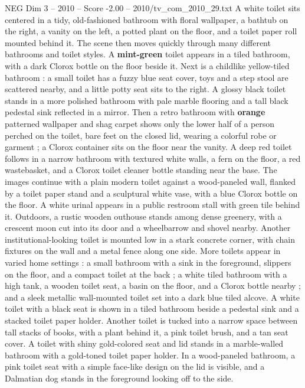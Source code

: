 \begin{textsample}{NEG Dim 3 – 2010 – Score -2.00 – 2010/tv\_com\_2010\_29.txt}  \label{ex:f3_neg_020}
A white toilet sits centered in a tidy, old-fashioned bathroom with floral wallpaper, a bathtub on the right, a vanity on the left, a potted plant on the floor, and a toilet paper roll mounted behind it.
The scene then moves quickly through many different bathrooms and toilet styles.
A \textbf{mint-green} toilet appears in a tiled bathroom, with a dark Clorox bottle on the floor beside it.
Next is a childlike yellow-tiled bathroom : a small toilet has a fuzzy blue seat cover, toys and a step stool are scattered nearby, and a little potty seat sits to the right.
A glossy black toilet stands in a more polished bathroom with pale marble flooring and a tall black pedestal sink reflected in a mirror.
Then a retro bathroom with \textbf{orange} patterned wallpaper and shag carpet shows only the lower half of a person perched on the toilet, bare feet on the closed lid, wearing a colorful robe or garment ; a Clorox container sits on the floor near the vanity.
A deep red toilet follows in a narrow bathroom with textured white walls, a fern on the floor, a red wastebasket, and a Clorox toilet cleaner bottle standing near the base.
The images continue with a plain modern toilet against a wood-paneled wall, flanked by a toilet paper stand and a sculptural white vase, with a blue Clorox bottle on the floor.
A white urinal appears in a public restroom stall with green tile behind it.
Outdoors, a rustic wooden outhouse stands among dense greenery, with a crescent moon cut into its door and a wheelbarrow and shovel nearby.
Another institutional-looking toilet is mounted low in a stark concrete corner, with chain fixtures on the wall and a metal fence along one side.
More toilets appear in varied home settings : a small bathroom with a sink in the foreground, slippers on the floor, and a compact toilet at the back ; a white tiled bathroom with a high tank, a wooden toilet seat, a basin on the floor, and a Clorox bottle nearby ; and a sleek metallic wall-mounted toilet set into a dark blue tiled alcove.
A white toilet with a black seat is shown in a tiled bathroom beside a pedestal sink and a stacked toilet paper holder.
Another toilet is tucked into a narrow space between tall stacks of books, with a plant behind it, a pink toilet brush, and a tan seat cover.
A toilet with shiny gold-colored seat and lid stands in a marble-walled bathroom with a gold-toned toilet paper holder.
In a wood-paneled bathroom, a pink toilet seat with a simple face-like design on the lid is visible, and a Dalmatian dog stands in the foreground looking off to the side.

\end{textsample}
